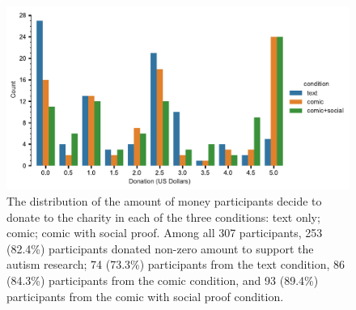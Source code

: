 \begin{figure}[htb]
	\includegraphics[width=1\textwidth]{./hari-code/contributions_across_conditions.pdf}
    \caption{The distribution of the amount of money participants decide to donate to the charity in each of the three conditions: text only; comic; comic with social proof. Among all 307 participants, 253 (82.4\%) participants donated non-zero amount to support the autism research; 74 (73.3\%) participants from the text condition, 86 (84.3\%) participants from the comic condition, and 93 (89.4\%) participants from the comic with social proof condition.
}
	\label{fig:contributions across conditions}
\end{figure}

